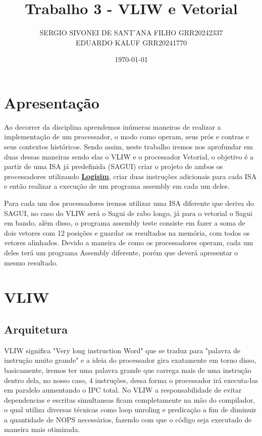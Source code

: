 \documentclass{article}
\title{Trabalho 3 - VLIW e Vetorial}
\author{SERGIO SIVONEI DE SANT'ANA FILHO GRR20242337\\EDUARDO KALUF GRR20241770}
\date{\today}
\begin{document}
    \maketitle
    
    \section{Apresentação}
    
    Ao decorrer da disciplina aprendemos inúmeras maneiras de realizar a implementação de um processador, o modo como operam, seus prós e contras e seus contextos históricos. Sendo assim, neste trabalho iremos nos aprofundar em duas dessas maneiras sendo elas o VLIW e o processador Vetorial, o objetivo é a partir de uma ISA já predefinida (SAGUI) criar o projeto de ambos os processadores utilizando \href{https://github.com/logisim-evolution/logisim-evolution}{\textbf{Logisim}}, criar duas instruções adicionais para cada ISA e então realizar a execução de um programa assembly em cada um deles.

    Para cada um dos processadores iremos utilizar uma ISA diferente que deriva do SAGUI, no caso do VLIW será o Sagui de rabo longo, já para o vetorial o Sagui em bando, além disso, o programa assembly teste consiste em fazer a soma de dois vetores com 12 posições e guardar os resultados na memória, com todos os vetores alinhados.
    Devido a maneira de como os processadores operam, cada um deles terá um programa Assembly diferente, porém que deverá apresentar o mesmo resultado.

    \section{VLIW}
    
    \subsection{Arquitetura}

    VLIW significa "Very long instruction Word" que se traduz para "palavra de instrução muito grande" e a ideia do processador gira exatamente em torno disso, basicamente, iremos ter uma palavra grande que carrega mais de uma instrução dentro dela, no nosso caso, 4 instruções, dessa forma o processador irá executa-las em paralelo aumentando o IPC total.
    No VLIW a responsabilidade de evitar dependencias e escritas simultaneas ficam completamente na mão do compilador, o qual utiliza diversas técnicas como loop unroling e predicação a fim de diminuir a quantidade de NOPS necessários, fazendo com que o código seja executado de maneira mais otimizada.
\end{document}
